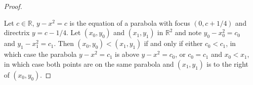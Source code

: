 \documentclass[11pt,a4paper,twoside]{article}
\theoremstyle{definition}
\begin{document}
\begin{proof}
\begin{description}
  \end{description}

  Let $c \in \mathbb{R}$, $y - x^2 = c$ is the equation of a parabola with focus $(0, c + 1 / 4)$ and directrix $y = c - 1 / 4$.
  Let $(x_0, y_0)$ and $(x_1, y_1)$ in $\mathbb{R}^2$ and note $y_0 - x_0^2 = c_0$ and $y_1 - x_1^2 = c_1$. Then $(x_0, y_0) < (x_1, y_1)$ if and only if
  either $c_0 < c_1$, in which case the parabola $y - x^2 = c_1$ is above $y - x^2 = c_0$, or $c_0 = c_1$ and $x_0 < x_1$, in which case both points are on the same parabola
  and $(x_1, y_1)$ is to the right of $(x_0, y_0)$.

\end{proof}
\end{document}
